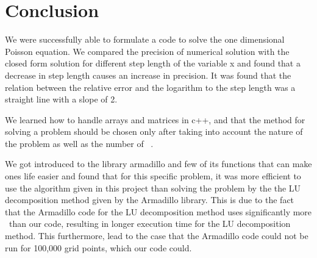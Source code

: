 \chapter{Conclusion}
We were  successfully able to formulate a code to solve the one dimensional Poisson equation. 
We  compared the precision of numerical solution with the closed form solution for different step length of the variable x and found that a decrease in step length causes an increase in precision. 
It was found that the relation between the relative error and the logarithm to the step length was a straight line with a slope of 2.  

We learned how to handle arrays and matrices in c++, and that the method for solving a problem should be chosen only after taking into account the nature of the problem as well as the number of \flops\ . 

We got introduced to the library armadillo and few of its functions  that can make ones life easier and found that for this specific problem, it was more efficient to use the algorithm given in this project than solving the problem by the the LU decomposition method given by the Armadillo library.
This is due to the fact that the Armadillo code for the LU decomposition method uses significantly more \flops \, than our code, resulting in longer execution time for the LU decomposition method. 
This furthermore, lead to the case that the Armadillo code could not be run for 100,000 grid points, which our code could.  

 
